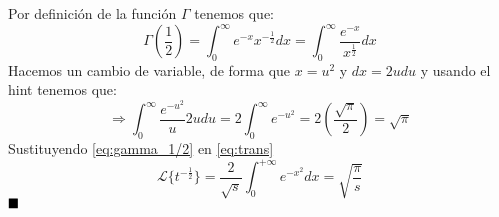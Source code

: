 Por definición de la función $\Gamma$ tenemos que:
\begin{equation*}
    \Gamma (\frac{1}{2})= \int_{0}^{\infty} e^{-x} x^{-\frac{1}{2}} dx= \int_{0}^{\infty} \frac{e^{-x}}{x^{\frac{1}{2}}}dx
\end{equation*}
Hacemos un cambio de variable, de forma que $x=u^{2}$ y $dx=2u du$ y usando el hint tenemos que:
\begin{equation}
    \Rightarrow \int_{0}^{\infty} \frac{e^{-u^{2}}}{u}2udu=2\int_{0}^{\infty} e^{-u^{2}}=2(\frac{\sqrt{\pi}}{2})=\sqrt{\pi}
    \label{eq:gamma_1/2}
\end{equation}
Sustituyendo \ref{eq:gamma_1/2} en \ref{eq:trans}
\begin{equation*}
     \mathscr{L}\{t^{-\frac{1}{2}}\}=\frac{2}{\sqrt{s}}\int_{0}^{+\infty}e^{-x^{2}}dx=\sqrt{\frac{\pi}{s}}
\end{equation*}
$\hfill \blacksquare$